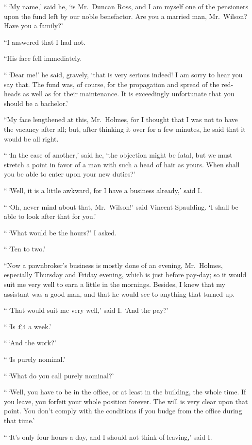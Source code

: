 “\,‘My name,’ said he, ‘is Mr.~Duncan Ross, and I am myself
one of the pensioners upon the fund left by our noble
benefactor. Are you a married man, Mr.~Wilson? Have you
a family?’

“I answered that I had not.

“His face fell immediately.

“\,‘Dear me!’ he said, gravely, ‘that is very serious indeed!
I am sorry to hear you say that. The fund was, of course,
for the propagation and spread of the red-heads as well as for
their maintenance. It is exceedingly unfortunate that you
should be a bachelor.’

“My face lengthened at this, Mr.~Holmes, for I thought
that I was not to have the vacancy after all; but, after
thinking it over for a few minutes, he said that it would be
all right.

“\,‘In the case of another,’ said he, ‘the objection might be
fatal, but we must stretch a point in favor of a man with such
a head of hair as yours. When shall you be able to enter
upon your new duties?’

“\,‘Well, it is a little awkward, for I have a business already,’
said I.

“\,‘Oh, never mind about that, Mr.~Wilson!’ said Vincent
Spaulding. ‘I shall be able to look after that for you.’

“\,‘What would be the hours?’ I asked.

“\,‘Ten to two.’

“Now a pawnbroker’s business is mostly done of an evening,
Mr.~Holmes, especially Thursday and Friday evening,
which is just before pay-day; so it would suit me very well
to earn a little in the mornings. Besides, I knew that my
assistant was a good man, and that he would see to anything
that turned up.

“\,‘That would suit me very well,’ said I. ‘And the pay?’

“\,‘Is £4 a week.’

“\,‘And the work?’

“\,‘Is purely nominal.’

“\,‘What do you call purely nominal?’

“\,‘Well, you have to be in the office, or at least in the
building, the whole time. If you leave, you forfeit your whole
position forever. The will is very clear upon that point.
You don’t comply with the conditions if you budge from the
office during that time.’

“\,‘It’s only four hours a day, and I should not think of
leaving,’ said I.

